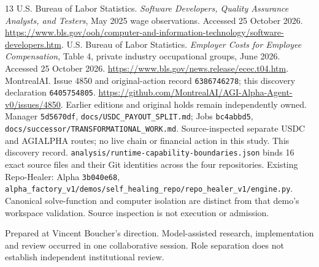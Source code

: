 \documentclass[11pt,letterpaper]{article}
\newcommand{\code}[1]{{\small\nolinkurl{#1}}}
\begin{document}
\begin{thebibliography}{13}
 U.S. Bureau of Labor Statistics. \emph{Software Developers, Quality Assurance Analysts, and Testers}, May 2025 wage observations. Accessed 25 October 2026. \url{https://www.bls.gov/ooh/computer-and-information-technology/software-developers.htm}.
 U.S. Bureau of Labor Statistics. \emph{Employer Costs for Employee Compensation}, Table 4, private industry occupational groups, June 2026. Accessed 25 October 2026. \url{https://www.bls.gov/news.release/ecec.t04.htm}.
 MontrealAI. Issue 4850 and original-action record \code{6386746278}; this discovery declaration \code{6405754805}. \url{https://github.com/MontrealAI/AGI-Alpha-Agent-v0/issues/4850}. Earlier editions and original holds remain independently owned.
 Manager \code{5d5670df}, \code{docs/USDC_PAYOUT_SPLIT.md}; Jobs \code{bc4abbd5}, \code{docs/successor/TRANSFORMATIONAL_WORK.md}. Source-inspected separate USDC and AGIALPHA routes; no live chain or financial action in this study.
 This discovery record. \code{analysis/runtime-capability-boundaries.json} binds 16 exact source files and their Git identities across the four repositories. Existing Repo-Healer: Alpha \code{3b040e68}, \code{alpha_factory_v1/demos/self_healing_repo/repo_healer_v1/engine.py}. Canonical solve-function and computer isolation are distinct from that demo's workspace validation. Source inspection is not execution or admission.
\end{thebibliography}
{\footnotesize\sffamily Prepared at Vincent Boucher's direction. Model-assisted research, implementation and review occurred in one collaborative session. Role separation does not establish independent institutional review.}
\end{document}
